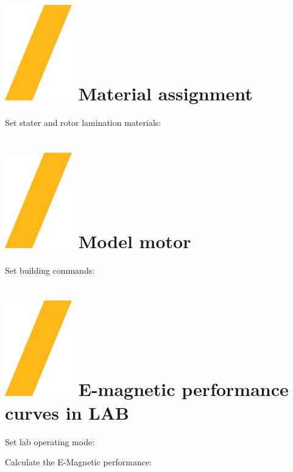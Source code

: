 \documentclass[landscape]{article}
\begin{document}
\begin{multicols}{3}
\section{\includegraphics[height=\fontcharht\font`\S]{slash.png} Material assignment}
Set stater and rotor lamination materials:

\section{\includegraphics[height=\fontcharht\font`\S]{slash.png} Model motor}
Set building commands:

\section{\includegraphics[height=\fontcharht\font`\S]{slash.png} E-magnetic performance curves in LAB}
Set lab operating mode:

Calculate the E-Magnetic performance:


\end{multicols}
\end{document}
